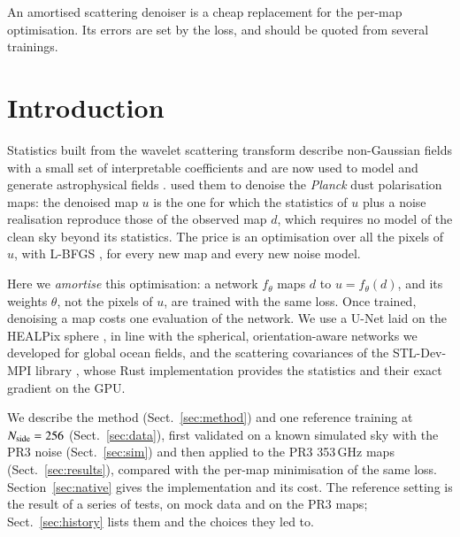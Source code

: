 \documentclass{aa}
\newcommand{\nside}{N_{\rm side}}
\begin{document}
{An amortised scattering denoiser is a cheap replacement for the per-map optimisation. Its errors are set by the loss, and should be quoted from several trainings.}


\maketitle

\section{Introduction}

Statistics built from the wavelet scattering transform \citep{mallat2012,bruna2013} describe non-Gaussian fields with a small set of interpretable coefficients and are now used to model and generate astrophysical fields \citep{allys2019,allys2020,cheng2020,cheng2024}. \citet{delouis2022} used them to denoise the \textit{Planck} dust polarisation maps: the denoised map $u$ is the one for which the statistics of $u$ plus a noise realisation reproduce those of the observed map $d$, which requires no model of the clean sky beyond its statistics. The price is an optimisation over all the pixels of $u$, with L-BFGS \citep{nocedal2006}, for every new map and every new noise model.

Here we \emph{amortise} this optimisation: a network $f_\theta$ maps $d$ to $u=f_\theta(d)$, and its weights $\theta$, not the pixels of $u$, are trained with the same loss. Once trained, denoising a map costs one evaluation of the network. We use a U-Net \citep{ronneberger2015} laid on the HEALPix sphere \citep{gorski2005}, in line with the spherical, orientation-aware networks we developed for global ocean fields, and the scattering covariances of the STL-Dev-MPI library \citep{stldev}, whose Rust implementation provides the statistics and their exact gradient on the GPU.

We describe the method (Sect.~\ref{sec:method}) and one reference training at $\nside=256$ (Sect.~\ref{sec:data}), first validated on a known simulated sky with the PR3 noise (Sect.~\ref{sec:sim}) and then applied to the PR3 353\,GHz maps (Sect.~\ref{sec:results}), compared with the per-map minimisation of the same loss. Section~\ref{sec:native} gives the implementation and its cost. The reference setting is the result of a series of tests, on mock data and on the PR3 maps; Sect.~\ref{sec:history} lists them and the choices they led to.
\end{document}
